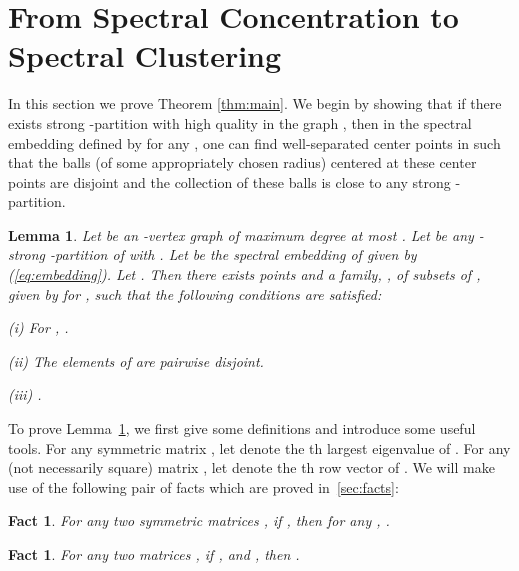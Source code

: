 \documentclass[11pt]{article}
\theoremstyle{plain}
\newtheorem{lemma}[theorem]{Lemma}
\newtheorem{fact}[theorem]{Fact}
\begin{document}
\section{From Spectral Concentration to Spectral Clustering}\label{sec:clustering}

In this section we prove Theorem \ref{thm:main}. We begin by showing that if
there exists strong -partition with high quality in the graph , then in
the spectral embedding defined by  for any , one can find  well-separated
center points in  such that the balls (of some appropriately
chosen radius) centered at these center points are disjoint and the collection
of these balls is close to any strong -partition.

\begin{lemma}\label{lem:sep}
Let  be an -vertex graph of maximum degree at most .
Let  be any -strong -partition of  with . Let  be
the spectral embedding of  given by (\ref{eq:embedding}). Let
. Then there exists  points
 and a family, , of  subsets of , given by  for , such that the following conditions are satisfied:
\begin{description}
\item{(i)} For , .
\item{(ii)} The elements of  are pairwise disjoint.
\item{(iii)} .
\end{description}
\end{lemma}

To prove Lemma~\ref{lem:sep}, we first give some definitions and introduce some useful tools. 
For any symmetric matrix , let  denote the th
largest eigenvalue of . For any (not necessarily square) matrix
, let  denote the th row vector of .
We will make use of the following pair of facts which are proved in~\ref{sec:facts}:

\begin{fact}\label{fact:eigenvalue-A-B}
For any two  symmetric matrices , if ,  then for any , .
\end{fact}

\begin{fact}\label{fact:rowdifference}
For any two  matrices , if , and , then .
\end{fact}
\end{document}
